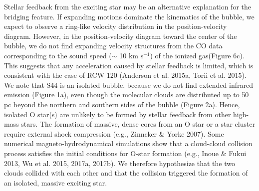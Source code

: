 \documentclass[onecolumn]{pasj01}
\begin{document}
{{{{{{{Stellar} feedback from the {exciting star} {may} be an alternative {explanation for} the bridging feature. 
If expanding {motion{s} dominate {the} kinematics of} the bubble, we {expect to observe} a ring-like velocity distribution in the position-velocity diagram.
However, in the {position}-velocity diagram {toward} the center of the bubble, we {do not} find expanding velocity structures {from the CO data corresponding} to the sound speed ($\sim$ 10 km s$^{-1}$) of the ionized gas}({Figure 6c}). {This suggests that {any acceleration caused by stellar} feedback is limited}, which is consistent {with the case of RCW 120} (Anderson et al. 2015a, Torii et al. 2015). {We note that S44 is an isolated bubble, because we {do not} find {extended} infrared emission (Figure 1a), {even} though the molecular clouds {are distributed up to 50 pc beyond the northern and} southern side{s of the} bubble (Figure 2a).}
Hence, {isolated O star(s)} are unlikely to be formed by stellar feedback from other high-mass stars.
The formation of {massive,} dense cores {from an O star or a} star cluster {require} external shock compression (e.g., Zinncker \& Yorke 2007).
{Some {numerical} magneto-hydrodynamical simulations} show that a cloud-cloud collision process {satisfies} {the initial condition{s for} O-star formation} (e.g., Inoue \& Fukui 2013, Wu et al. 2015, 2017a, 2017b).
 {We therefore} {hypothesize} that the two clouds collided with each other and {that} the collision triggered the formation of {an} isolated, {massive} exciting star.}


}}}}
\end{document}
